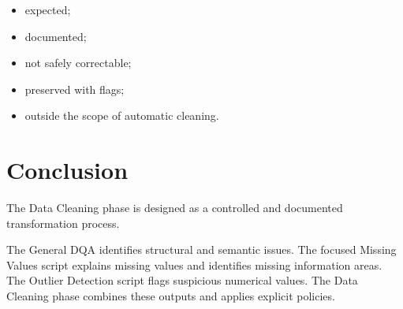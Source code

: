 \documentclass[a4paper,11pt]{article}
\begin{document}
	\begin{itemize}[leftmargin=1.2cm]
		\item expected;
		\item documented;
		\item not safely correctable;
		\item preserved with flags;
		\item outside the scope of automatic cleaning.
	\end{itemize}
	


	\section{Conclusion}
	
	The Data Cleaning phase is designed as a controlled and documented transformation process.
	
	The General DQA identifies structural and semantic issues.
	The focused Missing Values script explains missing values and identifies missing information areas.
	The Outlier Detection script flags suspicious numerical values.
	The Data Cleaning phase combines these outputs and applies explicit policies.
	

	
\end{document}
